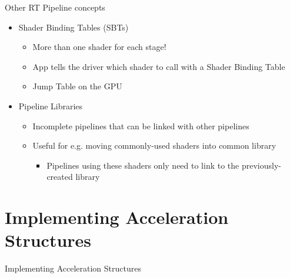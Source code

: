 \documentclass[aspectratio=169,t]{beamer}
\begin{document}
\begin{slide}{Other RT Pipeline concepts}
    \begin{itemize}
      \item Shader Binding Tables (SBTs)
      \begin{itemize}
       \item More than one shader for each stage!
       \item App tells the driver which shader to call with a Shader Binding Table
       \item Jump Table on the GPU
      \end{itemize}
      \item Pipeline Libraries
      \begin{itemize}
       \item Incomplete pipelines that can be linked with other pipelines
       \item Useful for e.g. moving commonly-used shaders into common library
      \begin{itemize}
       \item Pipelines using these shaders only need to link to the previously-created library
      \end{itemize}
      \end{itemize}

    \end{itemize}
\end{slide}

\section{Implementing Acceleration Structures}

\chapterIntroConfig
\begin{slide}{Implementing Acceleration Structures}
\end{slide}
\end{document}
